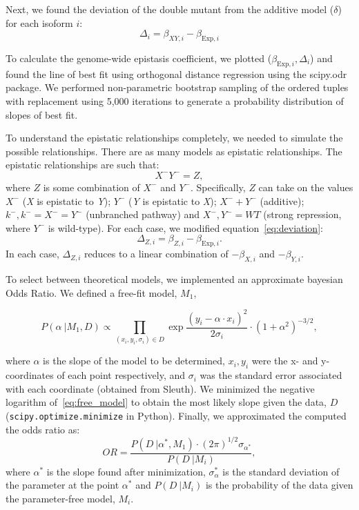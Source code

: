 \documentclass[9pt,twocolumn,twoside]{pnas-new}
\newcommand{\gene}[1]{\emph{#1}}
\begin{document}
{Next, we found the deviation of the double mutant from the additive model ($\delta$)
for each isoform $i$:
\begin{equation}
  \Delta_i = \beta_{XY,i} - \beta_{\mathrm{Exp},i}
  \label{eq:deviation}
\end{equation}

To calculate the genome-wide epistasis coefficient, we plotted
($\beta_{\mathrm{Exp},i}, \Delta_i$) and found the line of best fit using
orthogonal distance regression using the scipy.odr package. We performed
non-parametric bootstrap sampling of the ordered tuples with replacement using
5,000 iterations to generate a probability distribution of slopes of best fit.

To understand the epistatic relationships completely, we needed to simulate the
possible relationships.
There are as many models as epistatic relationships. The epistatic relationships
are such that:
\begin{equation}
  X^-Y^- = Z,
\end{equation}
where $Z$ is some combination of $X^-$ and $Y^-$. Specifically, $Z$ can take on
the values $X^-$ (\gene{X} is epistatic to \gene{Y}); $Y^-$ (\gene{Y} is epistatic
to \gene{X});
$X^- + Y^-$ (additive); $k^-, k^-=X^-=Y^-$ (unbranched pathway) and
$X^-, Y^-=WT$ (strong repression, where $Y^-$ is wild-type).
For each case, we modified equation~\ref{eq:deviation}:
\begin{equation}
  \Delta_{Z,i} = \beta_{Z,i} - \beta_{\mathrm{Exp},i}.
\end{equation}
In each case, $\Delta_{Z,i}$ reduces to a linear combination of $-\beta_{X,i}$
and $-\beta_{Y,i}$.

To select between theoretical models, we implemented an approximate bayesian
Odds Ratio. We defined a free-fit model, $M_1$,

\begin{equation}
  P(\alpha~|M_1, D) \propto \prod_{(x_i, y_i, \sigma_i)\in D}
  \exp{\frac{(y_i - \alpha\cdot x_i)^2}{2\sigma_i}}\cdot (1+\alpha^2)^{-3/2},
  \label{eq:free_model}
\end{equation}

where $\alpha$ is the slope of the model to be determined, $x_i, y_i$ were the
x- and y-coordinates of each point respectively, and $\sigma_i$ was the standard
error associated with each coordinate (obtained from Sleuth). We minimized the
negative logarithm of~\ref{eq:free_model} to obtain the most likely slope given
the data, $D$ (\texttt{scipy.optimize.minimize} in Python). Finally, we
approximated the computed the odds ratio as:
\begin{equation}
  OR = \frac{
  P(D~|\alpha^*, M_1)\cdot (2\pi)^{1/2}\sigma_{\alpha^*}
  }{P(D~| M_i)},
\end{equation}
where $\alpha^*$ is the slope found after minimization, $\sigma_\alpha^*$ is the
standard deviation of the parameter at the point $\alpha^*$ and $P(D~|M_i)$ is the
probability of the data given the parameter-free model, $M_i$.


}
\end{document}
